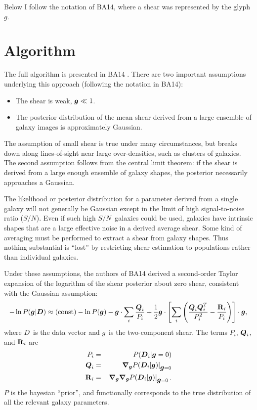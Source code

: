 \documentclass[12pt,preprint]{aastex}
\newcommand{\sn}{$S/N$}
\newcommand{\vecg}{\mbox{\boldmath $g$}}
\newcommand{\vecD}{\mbox{\boldmath $D$}}
\newcommand{\vecQ}{\mbox{\boldmath $Q$}}
\newcommand{\matR}{\mbox{$\bf R$}}
\newcommand{\bnabg}{ \boldsymbol{\nabla_g}}
\begin{document}
Below I follow the notation of BA14, where a shear was represented by the
glyph \vecg.

\section{Algorithm} \label{sec:algo}

The full algorithm is presented in BA14 .  There are two important assumptions
underlying this approach (following the notation in BA14):

\begin{itemize}

    \item The shear is weak, $\vecg \ll 1$.

    \item The posterior distribution of the mean shear derived from a large
        ensemble of galaxy images is approximately Gaussian.

\end{itemize}

The assumption of small shear is true under many circumstances, but breaks down
along lines-of-sight near large over-densities, such as clusters of galaxies.
The second assumption follows from the central limit theorem: if the shear is
derived from a large enough ensemble of galaxy shapes, the posterior
necessarily approaches a Gaussian.

The likelihood or posterior distribution for a parameter derived from a single
galaxy will not generally be Gaussian except in the limit of high
signal-to-noise ratio (\sn). Even if such high \sn\ galaxies could be used,
galaxies have intrinsic shapes that are a large effective noise in a derived
average shear.  Some kind of averaging must be performed to extract a shear
from galaxy shapes.  Thus nothing substantial is ``lost'' by restricting shear
estimation to populations rather than individual galaxies.  

Under these assumptions, the authors of BA14 derived a second-order Taylor
expansion of the logarithm of the shear posterior about zero shear, consistent
with the Gaussian assumption:
\begin{equation} \label{eq:pexpand}
-\ln P(\vecg | \vecD) \approx {(\rm const)} - \ln P(\vecg) - \vecg \cdot \sum_i
    \frac{\vecQ_i}{P_i}
    + \frac{1}{2} \vecg \cdot \left[ \sum_i \left(\frac{\vecQ_i \vecQ^T_i}{P_i^2}
    - \frac{\matR_i}{P_i}\right) \right] \cdot \vecg,
\end{equation}
where \vecD\ is the data vector and \vecg\ is the two-component shear.  The
terms $P_i$, $\vecQ_i$, and $\matR_i$ are 
\begin{eqnarray} \label{eq:pqrdef}
P_i     & = & P(\vecD_i | \vecg=0) \nonumber \\
\vecQ_i & = & \left. \bnabg P(\vecD_i | \vecg)\right|_{\vecg=0} \\
\matR_i & = & \left. \bnabg \bnabg P(\vecD_i | \vecg)\right|_{\vecg=0}. \nonumber
\end{eqnarray}
$P$ is the bayesian ``prior'', and functionally corresponds to the true
distribution of all the relevant galaxy parameters.
\end{document}
